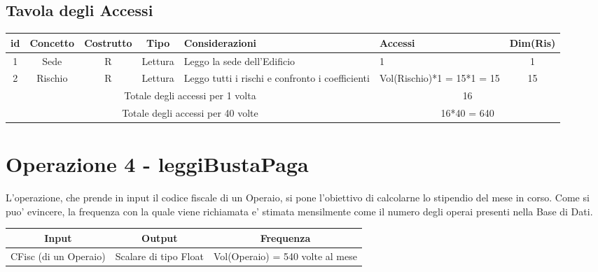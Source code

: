 \documentclass[12pt,a4paper]{report}
\begin{document}
        \subsection{Tavola degli Accessi}
        \begin{tabular}{|c|c|c|c|p{4cm}|p{3cm}|c|}
            \hline
            \textbf{id} & \textbf{Concetto} & \textbf{Costrutto} & \textbf{Tipo} & \textbf{Considerazioni} & \textbf{Accessi} & \textbf{Dim(Ris)} \\ \hline
            1 & Sede & R & Lettura & Leggo la sede dell'Edificio & 1 & 1 \\ \hline
            2 & Rischio & R & Lettura & Leggo tutti i rischi e confronto i coefficienti & Vol(Rischio)*1 = 15*1 = 15 & 15 \\ \hline
            \multicolumn{5}{|c|}{Totale degli accessi per 1 volta} & \multicolumn{2}{|c|}{16} \\ \hline
            \multicolumn{5}{|c|}{Totale degli accessi per 40 volte} & \multicolumn{2}{|c|}{16*40 = 640} \\ \hline
        \end{tabular}
        

        \section{Operazione 4 - leggiBustaPaga}
            L'operazione, che prende in input il codice fiscale di un Operaio, si pone l'obiettivo di calcolarne lo stipendio del mese in corso.
            Come si puo' evincere, la frequenza con la quale viene richiamata e' stimata mensilmente come il numero degli operai presenti nella Base di Dati.

            \begin{center}
                \begin{tabular}{|c|c|c|}
                    \hline
                    \rowcolor{viola} \textbf{Input} & \textbf{Output} & \textbf{Frequenza} \\ \hline
                    CFisc (di un Operaio) & Scalare di tipo Float & Vol(Operaio) = 540 volte al mese \\ \hline
                \end{tabular}
            \end{center}
            
\end{document}
